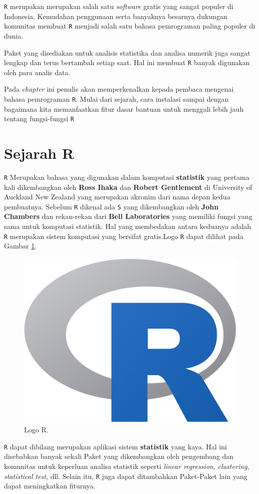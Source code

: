 \documentclass[
]{book}
\theoremstyle{definition}
\theoremstyle{definition}
\theoremstyle{definition}
\theoremstyle{definition}
\theoremstyle{remark}
\begin{document}
\texttt{R} merupakan merupakan salah satu \emph{software} gratis yang sangat populer di Indonesia. Kemudahan penggunaan serta banyaknya besarnya dukungan komunitas membuat \texttt{R} menjadi salah satu bahasa pemrograman paling populer di dunia.

Paket yang disediakan untuk analisis statistika dan analisa numerik juga sangat lengkap dan terus bertambah setiap saat. Hal ini membuat \texttt{R} banyak digunakan oleh para analis data.

Pada \emph{chapter} ini penulis akan memperkenalkan kepada pembaca mengenai bahasa pemrograman \texttt{R}. Mulai dari sejarah, cara instalasi sampai dengan bagaimana kita memanfaatkan fitur dasar bantuan untuk menggali lebih jauh tentang fungsi-fungsi \texttt{R}

\hypertarget{sejarahR}{%
\section{Sejarah R}\label{sejarahR}}

\texttt{R} Merupakan bahasa yang digunakan dalam komputasi \textbf{statistik} yang pertama kali dikembangkan oleh \textbf{Ross Ihaka} dan \textbf{Robert Gentlement} di University of Auckland New Zealand yang merupakan akronim dari nama depan kedua pembuatnya. Sebelum \texttt{R} dikenal ada \texttt{S} yang dikembangkan oleh \textbf{John Chambers} dan rekan-rekan dari \textbf{Bell Laboratories} yang memiliki fungsi yang sama untuk komputasi statistik. Hal yang membedakan antara keduanya adalah \texttt{R} merupakan sistem komputasi yang bersifat gratis.Logo \texttt{R} dapat dilihat pada Gambar \ref{fig:Logo}.

\begin{figure}

{\centering \includegraphics[width=0.4\linewidth]{./images/r-icon} 

}

\caption{Logo R.}\label{fig:Logo}
\end{figure}

\texttt{R} dapat dibilang merupakan aplikasi sistem \textbf{statistik} yang kaya. Hal ini disebabkan banyak sekali Paket yang dikembangkan oleh pengembang dan komunitas untuk keperluan analisa statistik seperti \emph{linear regression}, \emph{clustering}, \emph{statistical test}, dll. Selain itu, \texttt{R} juga dapat ditambahkan Paket-Paket lain yang dapat meningkatkan fiturnya.
\end{document}
